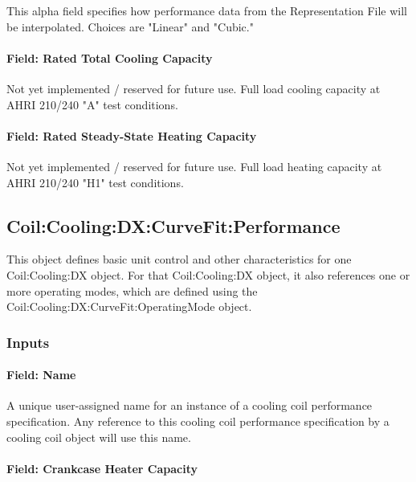 This alpha field specifies how performance data from the Representation File will be interpolated.
Choices are "Linear" and "Cubic."

\paragraph{Field: Rated Total Cooling Capacity}

Not yet implemented / reserved for future use. Full load cooling capacity at AHRI 210/240 "A" test conditions.

\paragraph{Field: Rated Steady-State Heating Capacity}

Not yet implemented / reserved for future use. Full load heating capacity at AHRI 210/240 "H1" test conditions.

\subsection{Coil:Cooling:DX:CurveFit:Performance}\label{coilcoolingdxcurvefitperformance}

This object defines basic unit control and other characteristics for one Coil:Cooling:DX object. For that Coil:Cooling:DX object, it also references one or more operating modes, which are defined using the Coil:Cooling:DX:CurveFit:OperatingMode object.

\subsubsection{Inputs}\label{inputs-02}

\paragraph{Field: Name}\label{field-name-02}

A unique user-assigned name for an instance of a cooling coil performance specification. Any reference to this cooling coil performance specification by a cooling coil object will use this name.

\paragraph{Field: Crankcase Heater Capacity}

